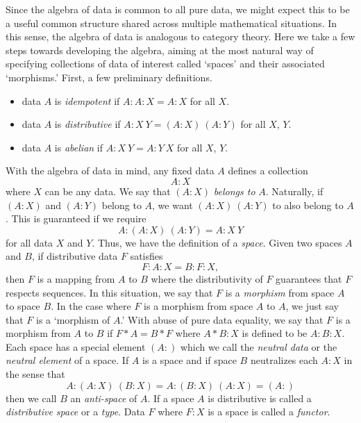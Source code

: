\documentclass[11pt]{article}
\begin{document}
     Since the algebra of data is common to all pure data, we might expect this to be a useful common structure shared 
 across multiple mathematical situations.  In this sense, the algebra of data is analogous to category theory. 
 Here we take a few steps towards developing the algebra, aiming at the most natural 
 way of specifying collections of data of interest called `spaces' and their associated `morphisms.'  First, a few 
 preliminary definitions.  
 \begin{itemize}
 \item data $A$ is {\it idempotent} if $A:A:X=A:X$ for all $X$.
 \item data $A$ is {\it distributive} if $A:X\ Y=(A:X)\ (A:Y)$ for all $X$, $Y$.
 \item data $A$ is {\it abelian} if $A:X\ Y=A:Y\ X$ for all $X$, $Y$.
 \end{itemize}
 With the algebra of data in mind, any fixed data $A$ defines a collection 
\begin{equation}\label{eqn}
A:X
\end{equation}
where $X$ can be any data.  We say that $(A:X)$ {\it belongs to} $A$.  Naturally, 
if $(A:X)$ and $(A:Y)$ belong to $A$, we want $(A:X)\ (A:Y)$ to also belong to $A$.  This is guaranteed if 
we require  
\begin{equation}\label{eqn}
A : (A : X)\ ( A: Y) = A : X\ Y 
\end{equation}
for all data $X$ and $Y$.  Thus, we have the definition of a {\it space}.  Given two spaces $A$ and $B$, if 
distributive data $F$ satisfies 
\begin{equation}\label{eqn}
F : A : X = B : F : X,
\end{equation}
then $F$ is a mapping from $A$ to $B$ where the distributivity of $F$ guarantees that $F$ respects sequences.  
In this situation, we say that $F$ is a {\it morphism} from space $A$ to space $B$.  In the case where $F$ 
is a morphism from space $A$ to $A$, we just say that $F$ is a `morphism of $A$.'  With abuse of pure data 
equality, we say that $F$ is a morphism from $A$ to $B$ if $F*A=B*F$ where $A*B:X$ is defined to be $A:B:X$.  
Each space has a special element $(A:)$ which we call the {\it neutral data} or the {\it neutral element} of a space.  
If $A$ is a space and if space $B$ neutralizes each $A:X$ in the sense that 
\begin{equation}\label{eqn}
A : (A:X)\ (B:X) = A : (B:X)\ (A:X) =  (A:)
\end{equation}
then we call $B$ an {\it anti-space} of $A$.  If a space $A$ is distributive is called a {\it distributive space} or a {\it type}.   
Data $F$ where $F:X$ is a space is called a {\it functor}.  
\end{document}

